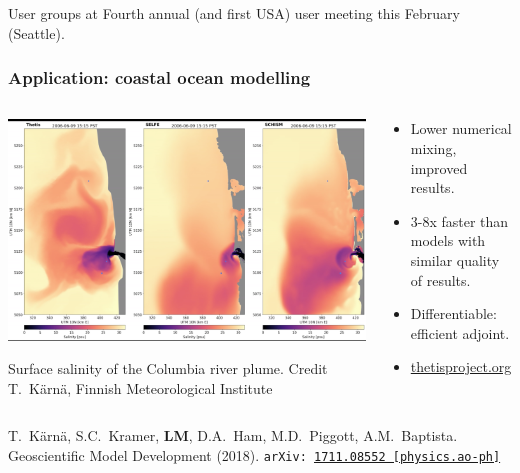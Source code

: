 \documentclass[presentation,aspectratio=43, 10pt]{beamer}
\newcommand{\arxivlink}[2]{{\texttt{arXiv:\,\href{https://arxiv.org/abs/#1}{#1\,[#2]}}}}
\begin{document}
\begin{frame}
\begin{overlayarea}{\textwidth}{0.6\textheight}
\begin{onlyenv}
\begin{block}{User groups at}
      Fourth annual (and first USA) user meeting this February (Seattle).
    \end{block}
  \end{onlyenv}
\end{overlayarea}
\end{frame}

\begin{frame}
  \frametitle{Application: coastal ocean modelling}
  \begin{columns}
    \begin{column}{0.55\textwidth}
      \includegraphics[height=0.45\textheight]{thetis-snapshot}

      {\tiny Surface salinity of the Columbia river plume. Credit
        T.~K\"arn\"a, Finnish Meteorological Institute}
    \end{column}
    \hspace{-0.04\textwidth}
    \begin{column}{0.48\textwidth}
      \begin{itemize}
      \item Lower numerical mixing, improved results.
      \item 3-8x faster than models with similar quality of results.
      \item Differentiable: efficient adjoint.
      \item \url{thetisproject.org}
       \end{itemize}
    \end{column}
  \end{columns}
  \begin{flushright}
    {\scriptsize T.~K\"arn\"a, S.C.~Kramer, \textbf{LM}, D.A.~Ham,
      M.D.~Piggott, A.M.~Baptista. Geoscientific Model Development
      (2018).
      \arxivlink{1711.08552}{physics.ao-ph}\nocite{Karna:2018}}
  \end{flushright}
\end{frame}
\end{document}
